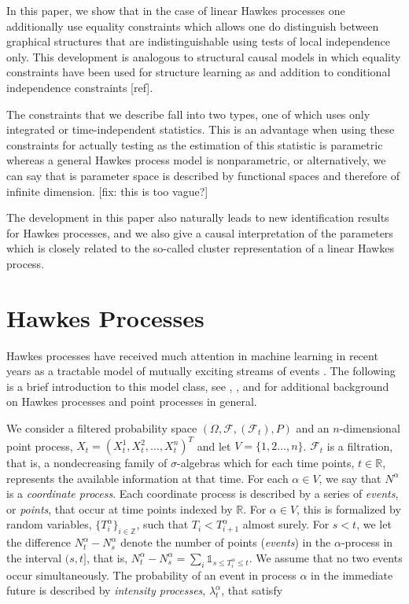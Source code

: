 \documentclass[accepted]{uai2021} %
\begin{document}
In this paper, we show that in the case of linear Hawkes processes one 
additionally 
use equality 
constraints which allows one do distinguish between graphical structures that 
are indistinguishable using tests of local independence only. This development 
is analogous to structural causal models in which equality constraints have 
been used for structure learning as and addition to conditional independence 
constraints [ref].

The constraints that we describe fall into two types, one of which uses only 
integrated or time-independent statistics. This is an advantage when using 
these constraints for actually testing as the estimation of this statistic is 
parametric whereas a general Hawkes process model is nonparametric, or 
alternatively, we can say that is parameter space is described by functional 
spaces and therefore of infinite dimension. [fix: this is too vague?]

The development in this paper also naturally leads to new identification 
results for Hawkes processes, 
and we also give a causal interpretation of the parameters which is closely 
related to the so-called cluster representation of a linear Hawkes process.




\section{Hawkes Processes}
\label{sec:hawPro}

Hawkes processes have received much attention in machine learning in recent 
years as a tractable model of mutually exciting streams of events 
\citep{zhou2013, zhou2013b,luo2015,etesami2016,tan2018,xu2018,trouleau2019}. 
The following is a brief introduction to this model class,
see \cite{laubHawkes2015}, \cite{linigerThesis}, and \cite{daleyVere} for 
additional background on Hawkes processes and point processes in general.

We consider a filtered probability space $(\Omega, \mathcal{F}, 
(\mathcal{F}_t), P)$ and an $n$-dimensional point process, $X_t = 
(X_t^1,X_t^2,\ldots,X_t^n)^T$ and let $V= \{1,2\ldots, n\}$. $\mathcal{F}_t$ is 
a filtration, that is, a nondecreasing family of $\sigma$-algebras which for 
each time points, $t\in \mathbb{R}$, represents the available information at 
that time. For each 
$\alpha\in 
V$, we say that $N^\alpha$ is a \emph{coordinate process}. Each coordinate 
process is described by a series of \emph{events}, or \emph{points}, that occur 
at time points indexed by $\mathbb{R}$. For $\alpha \in V$, this is formalized 
by random variables, $\{T_i^\alpha\}_{i\in\mathbb{Z}}$, such 
that $T_i < T_{i+1}^\alpha$ almost surely. For $s<t$, we let the difference 
$N_t^\alpha - 
N_s^\alpha$ denote the number of points (\emph{events}) in the $\alpha$-process 
in the interval $(s,t]$, that is,  $N_t^\alpha - 
N_s^\alpha= \sum_i \mathds{1}_{s \leq T_i^\alpha \leq t}$. We 
assume that no 
two events occur simultaneously. The probability of an event in process 
$\alpha$ in the immediate 
future is described by \emph{intensity processes}, $\lambda_t^\alpha$, that 
satisfy
\end{document}
